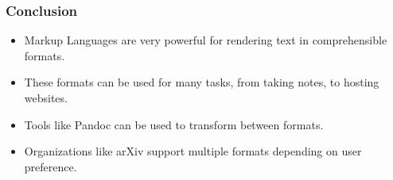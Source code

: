 \documentclass[15pt]{beamer}
\begin{document}
\begin{frame}
\frametitle{Conclusion}

\begin{block}{}
    \begin{itemize}
        \item Markup Languages are very powerful for rendering text in comprehensible formats. 
        \item These formats can be used for many tasks, from taking notes, to hosting websites.
        \item Tools like Pandoc can be used to transform between formats.
        \item Organizations like arXiv support multiple formats depending on user preference.
    \end{itemize}
\end{block}

\end{frame}
\end{document}

